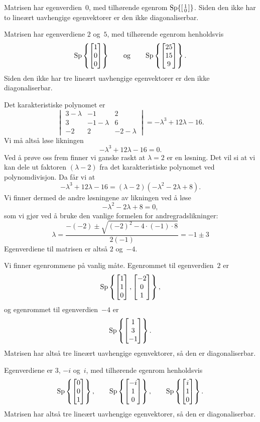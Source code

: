 \begin{losning}
\begin{punkt}
Matrisen har egenverdien~$0$, med tilhørende egenrom $\operatorname{Sp} \{ \left[ \begin{smallmatrix} 1 \\ 0 \end{smallmatrix} \right] \}$.
Siden den ikke har to lineært uavhengige egenvektorer er den
ikke diagonaliserbar.
\end{punkt}

\begin{punkt}
Matrisen har egenverdiene $2$ og~$5$, med tilhørende egenrom
henholdsvis
\[
\operatorname{Sp} \left\{ \begin{bmatrix} 1 \\ 0 \\ 0 \end{bmatrix} \right\}
\qquad\text{og}\qquad
\operatorname{Sp} \left\{ \begin{bmatrix} 25 \\ 15 \\ 9 \end{bmatrix} \right\}.
\]
Siden den ikke har tre lineært uavhengige egenvektorer er den
ikke diagonaliserbar.
\end{punkt}

\begin{punkt}
Det karakteristiske polynomet er
\[
\begin{vmatrix}
3-\lambda & -1         & 2          \\
3         & -1-\lambda & 6          \\
-2        & 2          & -2-\lambda
\end{vmatrix}
=
-\lambda^3 + 12\lambda - 16.
\]
Vi må altså løse likningen
\[
-\lambda^3 + 12\lambda - 16 = 0.
\]
Ved å prøve oss frem finner vi ganske raskt at $\lambda=2$ er en
løsning.  Det vil si at vi kan dele ut faktoren $(\lambda-2)$ fra det
karakteristiske polynomet ved polynomdivisjon.  Da får vi at
\[
-\lambda^3 + 12\lambda - 16 = (\lambda - 2) (-\lambda^2 - 2\lambda + 8).
\]
Vi finner dermed de andre løsningene av likningen ved å løse
\[
-\lambda^2 - 2\lambda + 8 = 0,
\]
som vi gjør ved å bruke den vanlige formelen for andregradslikninger:
\[
\lambda
 = \frac{-(-2) \pm \sqrt{(-2)^2 - 4 \cdot (-1) \cdot 8}}{2 (-1)}
 = -1 \pm 3
\]
Egenverdiene til matrisen er altså $2$ og~$-4$.

Vi finner egenrommene på vanlig måte.  Egenrommet til egenverdien~$2$ er
\[
\operatorname{Sp} \left\{ \begin{bmatrix} 1 \\ 1 \\ 0 \end{bmatrix}, \begin{bmatrix} -2 \\ 0 \\ 1 \end{bmatrix} \right\},
\]
og egenrommet til egenverdien~$-4$ er
\[
\operatorname{Sp} \left\{ \begin{bmatrix} 1 \\ 3 \\ -1 \end{bmatrix} \right\}.
\]
Matrisen har altså tre lineært uavhengige egenvektorer, så den er
diagonaliserbar.
\end{punkt}

\begin{punkt}
Egenverdiene er $3$, $-i$ og~$i$, med tilhørende egenrom henholdsvis
\[
\operatorname{Sp} \left\{ \begin{bmatrix} 0 \\ 0 \\ 1 \end{bmatrix} \right\},\qquad
\operatorname{Sp} \left\{ \begin{bmatrix} -i \\ 1 \\ 0 \end{bmatrix} \right\},\qquad
\operatorname{Sp} \left\{ \begin{bmatrix} i \\ 1 \\ 0 \end{bmatrix} \right\}.
\]
Matrisen har altså tre lineært uavhengige egenvektorer, så den er
diagonaliserbar.
\end{punkt}


\end{losning}

